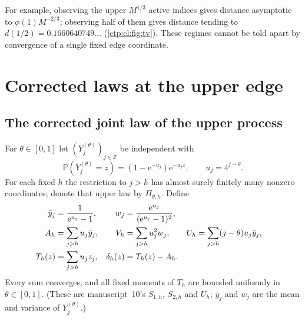 \documentclass[11pt,a4paper]{article}
\numberwithin{equation}{section}
\theoremstyle{definition}
\theoremstyle{remark}
\newcommand{\Z}{\mathbb Z}
\newcommand{\e}{\mathrm e}
\newcommand{\PP}{\mathbb P}
\begin{document}
For example, observing the upper $M^{1/3}$ active indices gives distance
asymptotic to $\phi(1)M^{-2/3}$; observing half of them gives distance
tending to $d(1/2)=0.1660640749\ldots$ (\cref{ctp:cl:fig:tv}). These regimes cannot be told apart
by convergence of a single fixed edge coordinate.

\section{Corrected laws at the upper edge}
\label{ctp:cl:sec:edge}

\subsection{The corrected joint law of the upper process}
For $\theta\in[0,1]$ let $(Y_j^{(\theta)})_{j\in\Z}$ be independent with
\begin{equation}\label{ctp:cl:eq:idealgeom}
 \PP(Y_j^{(\theta)}=z)=(1-\e^{-u_j})\e^{-u_jz},\qquad u_j=4^{j-\theta}.
\end{equation}
For each fixed $h$ the restriction to $j>h$ has almost surely finitely many
nonzero coordinates; denote that upper law by $\Pi_{\theta,h}$. Define
\begin{align}
 \bar y_j&=\frac1{\e^{u_j}-1},& w_j&=\frac{\e^{u_j}}{(\e^{u_j}-1)^2},
 \label{ctp:cl:eq:muw}\\
 A_h&=\sum_{j>h}u_j\bar y_j,& V_h&=\sum_{j>h}u_j^2w_j,&
 U_h&=\sum_{j>h}(j-\theta)u_j\bar y_j,\label{ctp:cl:eq:AVB}\\
 T_h(z)&=\sum_{j>h}u_jz_j,& \delta_h(z)&=T_h(z)-A_h.\notag
\end{align}
Every sum converges, and all fixed moments of $T_h$ are bounded uniformly in
$\theta\in[0,1]$. (These are manuscript~10's $S_{1,h}$, $S_{2,h}$ and $U_h$;
$\bar y_j$ and $w_j$ are the mean and variance of $Y_j^{(\theta)}$.)
\end{document}
